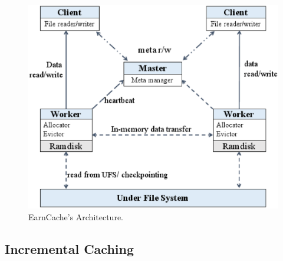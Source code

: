 \begin{figure}[!htbp]
\centering
\includegraphics[scale=0.40]{figures/architecture.eps}
\caption{EarnCache's Architecture.}
\label{fig:Arch}
\end{figure}


\subsection{Incremental Caching}\label{sec:framework master}

